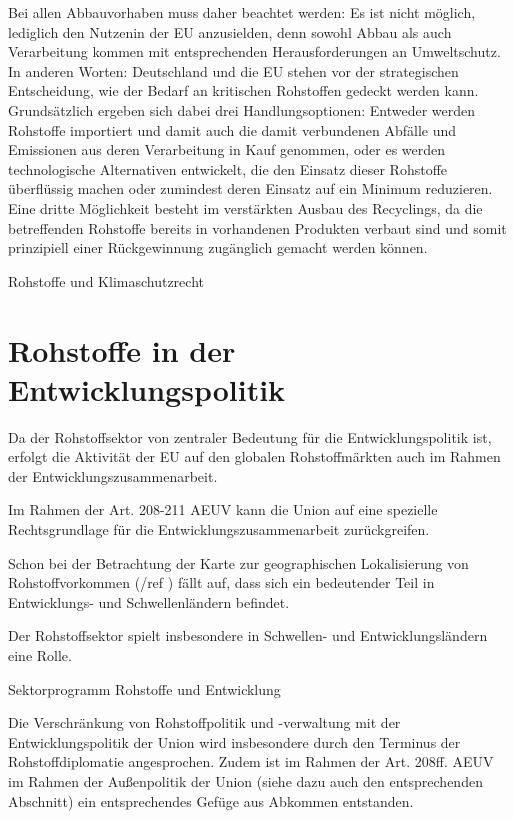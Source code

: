 \documentclass[12pt,a4paper,oneside]{book} %
\begin{document}
Bei allen Abbauvorhaben muss daher beachtet werden: Es ist nicht möglich, lediglich den \glqq Nutzen\grqq in der EU anzusielden, denn sowohl Abbau als auch Verarbeitung kommen mit entsprechenden Herausforderungen an Umweltschutz. In anderen Worten: Deutschland und die EU stehen vor der strategischen Entscheidung, wie der Bedarf an kritischen Rohstoffen gedeckt werden kann. Grundsätzlich ergeben sich dabei drei Handlungsoptionen: Entweder werden Rohstoffe importiert und damit auch die damit verbundenen Abfälle und Emissionen aus deren Verarbeitung in Kauf genommen, oder es werden technologische Alternativen entwickelt, die den Einsatz dieser Rohstoffe überflüssig machen oder zumindest deren Einsatz auf ein Minimum reduzieren. Eine dritte Möglichkeit besteht im verstärkten Ausbau des Recyclings, da die betreffenden Rohstoffe bereits in vorhandenen Produkten verbaut sind und somit prinzipiell einer Rückgewinnung zugänglich gemacht werden können.

Rohstoffe und Klimaschutzrecht


\section{Rohstoffe in der Entwicklungspolitik}

Da der Rohstoffsektor von zentraler Bedeutung für die Entwicklungspolitik ist, erfolgt die Aktivität der EU auf den globalen Rohstoffmärkten auch im Rahmen der Entwicklungszusammenarbeit.\autocite{Schorkopf, Rn. 53}



Im Rahmen der Art. 208-211 AEUV kann die Union auf eine spezielle Rechtsgrundlage für die Entwicklungszusammenarbeit zurückgreifen.

Schon bei der Betrachtung der Karte zur geographischen Lokalisierung von Rohstoffvorkommen (/ref ) fällt auf, dass sich ein bedeutender Teil in Entwicklungs- und Schwellenländern befindet.

Der Rohstoffsektor spielt insbesondere in Schwellen- und Entwicklungsländern eine Rolle.

Sektorprogramm Rohstoffe und Entwicklung

Die Verschränkung von Rohstoffpolitik und -verwaltung mit der Entwicklungspolitik der Union wird insbesondere durch den Terminus der Rohstoffdiplomatie angesprochen. Zudem ist im Rahmen der Art. 208ff. AEUV im Rahmen der Außenpolitik der Union (siehe dazu auch den entsprechenden Abschnitt) ein entsprechendes Gefüge aus Abkommen entstanden.
\end{document}
